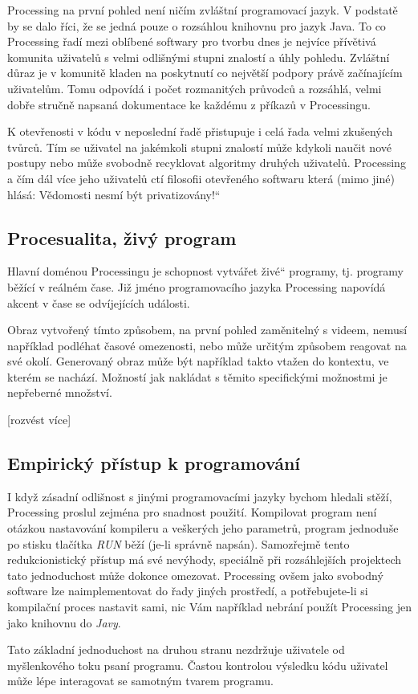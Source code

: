 \documentclass[10pt,twopage]{book}
\renewcommand\uv[1]{\quotedblbase #1\textquotedblleft}%
\newcommand{\pododdil}[1]{\subsection{#1}\label{subsec:#1}}
\begin{document}
Processing na první pohled není ničím zvláštní programovací jazyk. V podstatě by se dalo říci, že se jedná pouze o rozsáhlou knihovnu pro jazyk Java. To co Processing řadí mezi oblíbené softwary pro tvorbu dnes je nejvíce přívětivá komunita uživatelů s velmi odlišnými stupni znalostí a úhly pohledu. Zvláštní důraz je v komunitě kladen na poskytnutí co největší podpory právě začínajícím uživatelům. Tomu odpovídá i počet rozmanitých průvodců a rozsáhlá, velmi dobře stručně napsaná dokumentace ke každému z příkazů v Processingu.

K otevřenosti v kódu v neposlední řadě přistupuje i celá řada velmi zkušených tvůrců. Tím se uživatel na jakémkoli stupni znalostí může kdykoli naučit nové postupy nebo může svobodně recyklovat algoritmy druhých uživatelů. Processing a čím dál více jeho uživatelů ctí filosofii otevřeného softwaru která (mimo jiné) hlásá: \uv{Vědomosti nesmí být privatizovány!}

\pododdil{Procesualita, živý program}

Hlavní doménou Processingu je schopnost vytvářet \uv{živé} programy, tj. programy běžící v reálném čase. Již jméno programovacího jazyka Processing napovídá akcent v čase se odvíjejících události.

Obraz vytvořený tímto způsobem, na první pohled zaměnitelný s videem, nemusí například podléhat časové omezenosti, nebo může určitým způsobem reagovat na své okolí. Generovaný obraz může být například takto vtažen do kontextu, ve kterém se nachází. Možností jak nakládat s těmito specifickými možnostmi je nepřeberné množství.

[rozvést více]

\pododdil{Empirický přístup k programování}

	I když zásadní odlišnost s jinými programovacími jazyky bychom hledali stěží, Processing proslul zejména pro snadnost použití. Kompilovat program není otázkou nastavování kompileru a veškerých jeho parametrů, program jednoduše po stisku tlačítka {\em RUN} běží (je-li správně napsán). Samozřejmě tento redukcionistický přístup má své nevýhody, speciálně při rozsáhlejších projektech tato jednoduchost může dokonce omezovat. Processing ovšem jako svobodný software lze naimplementovat do řady jiných prostředí, a potřebujete-li si kompilační proces nastavit sami, nic Vám například nebrání použít Processing jen jako knihovnu do {\em Javy}.

Tato základní jednoduchost na druhou stranu nezdržuje uživatele od myšlenkového toku psaní programu. Častou kontrolou výsledku kódu uživatel může lépe interagovat se samotným tvarem programu.
\end{document}
